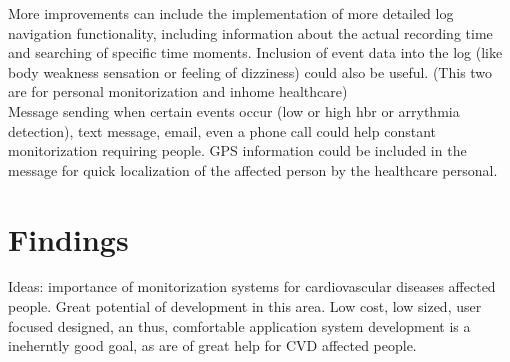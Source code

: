 		More improvements can include the implementation of more detailed log navigation functionality, including information about the actual recording time and searching of specific time moments.
		Inclusion of event data into the log (like body weakness sensation or feeling of dizziness) could also be useful.
		(This two are for personal monitorization and inhome healthcare)\\

		Message sending when certain events occur (low or high hbr or arrythmia detection), text message, email, even a phone call could help constant monitorization requiring people. GPS information could be included in the message for quick localization of the affected person by the healthcare personal.

	
	\section{Findings}
	\label{sec:end-findings}

		Ideas: importance of monitorization systems for cardiovascular diseases affected people. Great potential of development in this area. Low cost, low sized, user focused designed, an thus, comfortable application system development is a ineherntly good goal, as are of great help for CVD affected people.